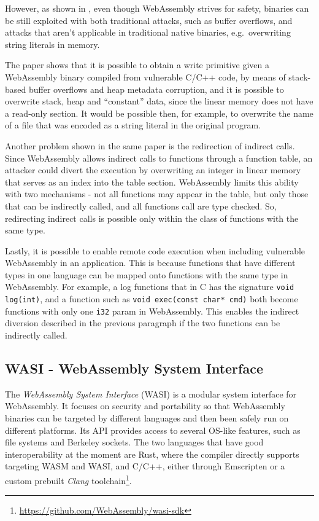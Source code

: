 However, as shown in \cite{binary-security-wasm-2020}, even though WebAssembly strives for safety,
binaries can be still exploited with both traditional attacks,
such as buffer overflows, and attacks that aren't applicable in traditional native binaries, e.g.\ overwriting
string literals in memory.

The paper shows that it is possible to obtain a write primitive given a WebAssembly binary compiled from vulnerable C/C++ code,
by means of stack-based buffer overflows and heap metadata corruption, and it is possible to overwrite stack, heap and ``constant''
data, since the linear memory does not have a read-only section. It would be possible then, for example, to overwrite the name
of a file that was encoded as a string literal in the original program.

Another problem shown in the same paper is the redirection of indirect calls. Since WebAssembly allows indirect calls
to functions through a function table, an attacker could divert the execution by overwriting an integer in linear memory
that serves as an index into the table section. WebAssembly limits this ability with two mechanisms - not all functions
may appear in the table, but only those that can be indirectly called, and all functions call are type checked.
So, redirecting indirect calls is possible only within the class of functions with the same type.

Lastly, it is possible to enable remote code execution when including vulnerable WebAssembly in an application.
This is because functions that have different types in one language can be mapped onto functions with the same type
in WebAssembly. For example, a log functions that in C has the signature \texttt{void log(int)}, and a function such as
\texttt{void exec(const char* cmd)} both become functions with only one \texttt{i32} param in WebAssembly.
This enables the indirect diversion described in the previous paragraph if the two functions can be indirectly called.

\subsection{WASI - WebAssembly System Interface}
\label{sec:introduction-wasi}

The \textit{WebAssembly System Interface} (WASI) \cite{wasi} is a modular system interface for WebAssembly.
It focuses on security and portability so that WebAssembly binaries can be targeted by different languages
and then been safely run on different platforms.
Its API provides access to several OS-like features, such as file systems and Berkeley sockets.
The two languages that have good interoperability at the moment are Rust, where the compiler directly supports targeting WASM and WASI,
and C/C++, either through Emscripten or a custom prebuilt \textit{Clang} toolchain\footnote{\url{https://github.com/WebAssembly/wasi-sdk}}.

